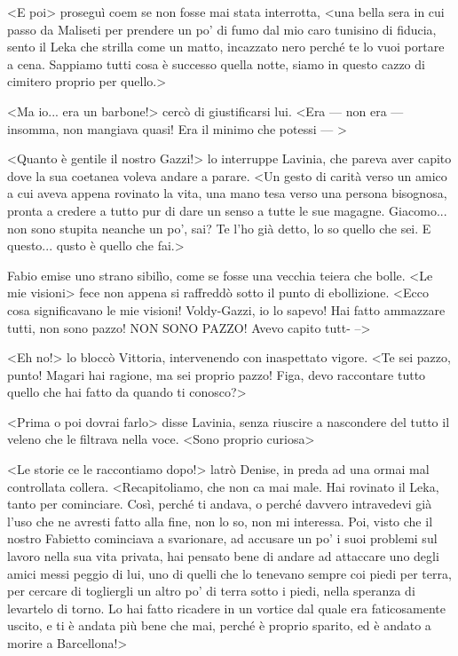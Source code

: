 <E poi> proseguì coem se non fosse mai stata interrotta, <una bella sera in cui passo da Maliseti per prendere un po' di fumo dal mio caro tunisino di fiducia, sento il Leka che strilla come un matto, incazzato nero perché te lo vuoi portare a cena. Sappiamo tutti cosa è successo quella notte, siamo in questo cazzo di cimitero proprio per quello.>

<Ma io... era un barbone!> cercò di giustificarsi lui. <Era --- non era --- insomma, non mangiava quasi! Era il minimo che potessi --- >

<Quanto è gentile il nostro Gazzi!> lo interruppe Lavinia, che pareva aver capito dove la sua coetanea voleva andare a parare. <Un gesto di carità verso un amico a cui aveva appena rovinato la vita, una mano tesa verso una persona bisognosa, pronta a credere a tutto pur di dare un senso a tutte le sue magagne. Giacomo... non sono stupita neanche un po', sai? Te l'ho già detto, lo so quello che sei. E questo... qusto è quello che fai.>

Fabio emise uno strano sibilìo, come se fosse una vecchia teiera che bolle. <Le mie visioni> fece non appena si raffreddò sotto il punto di ebollizione. <Ecco cosa significavano le mie visioni! Voldy-Gazzi, io lo sapevo! Hai fatto ammazzare tutti, non sono pazzo! NON SONO PAZZO! Avevo capito tutt- -->

<Eh no!> lo bloccò Vittoria, intervenendo con inaspettato vigore. <Te sei pazzo, punto! Magari hai ragione, ma sei proprio pazzo! Figa, devo raccontare tutto quello che hai fatto da quando ti conosco?>

<Prima o poi dovrai farlo> disse Lavinia, senza riuscire a nascondere del tutto il veleno che le filtrava nella voce. <Sono proprio curiosa>

<Le storie ce le raccontiamo dopo!> latrò Denise, in preda ad una ormai mal controllata collera. <Recapitoliamo, che non ca mai male. Hai rovinato il Leka, tanto per cominciare. Così, perché ti andava, o perché davvero intravedevi già l'uso che ne avresti fatto alla fine, non lo so, non mi interessa. Poi, visto che il nostro Fabietto cominciava a svarionare, ad accusare un po' i suoi problemi sul lavoro nella sua vita privata, hai pensato bene di andare ad attaccare uno degli amici messi peggio di lui, uno di quelli che lo tenevano sempre coi piedi per terra, per cercare di togliergli un altro po' di terra sotto i piedi, nella speranza di levartelo di torno. Lo hai fatto ricadere in un vortice dal quale era faticosamente uscito, e ti è andata più bene che mai, perché è proprio sparito, ed è andato a morire a Barcellona!>

